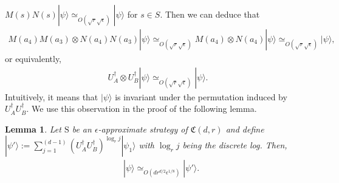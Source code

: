 \documentclass[11pt,letterpaper]{article}
\newcommand{\ket}[1]{|#1\rangle}
\newcommand{\x}{\otimes}
\newcommand{\ct}{^{\dagger}}
\newcommand{\1}{\mathbb{1}}
\newcommand{\fC}{\mathfrak{C}}
\newcommand{\bS}{\mathrm{S}}
\newcommand{\ep}{\epsilon}
\newcommand{\se}{\sqrt{\epsilon}}
\newcommand{\sr}{\sqrt{r}}
\newcommand{\appd}[1]{\simeq_{#1}}
\newtheorem{lemma}[theorem]{Lemma}
\theoremstyle{definition}
\begin{document}
$M(s)N(s) \ket{\psi} \appd{O(\sr\se)} \ket{\psi}$ for $s \in S$.
Then we can deduce that 
\begin{align*}
	M(a_4)M(a_3) \x N(a_4)N(a_3) \ket{\psi} \appd{O(\sr\se)} M(a_4) \x N(a_4) \ket{\psi} \appd{O(\sr\se)} \ket{\psi},
\end{align*}
or equivalently,
\begin{align*}
	U_A\ct \x U_B\ct \ket{\psi} \appd{O(\sr\se)} \ket{\psi}.
\end{align*}
Intuitively, it means that $\ket{\psi}$ is invariant under the permutation induced by $U_A\ct U_B\ct$.
We use this observation in the proof of the following lemma.
\begin{lemma}
\label{lm:decomp_psi}
Let $\bS$ be an $\ep$-approximate strategy of $\fC(d,r)$ and 
define 
$\ket{\psi'} := \sum_{j=1}^{(d-1)} (U_A\ct U_B\ct)^{\log_r j} \ket{\psi_1}$
with $\log_r j$ being the discrete log.
Then,
\begin{align}
	&\ket{\psi} \appd{O(d r^{d/2} \ep^{1/8})} \ket{\psi'}.
\end{align}
\end{lemma}
\end{document}
